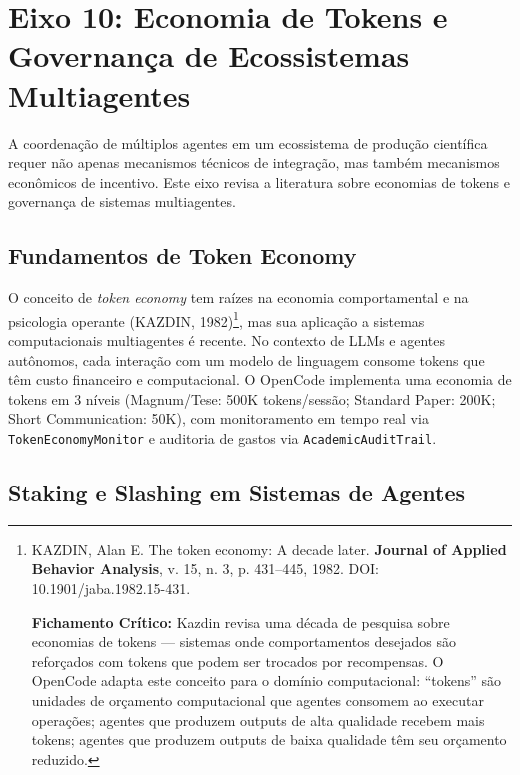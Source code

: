 \section{Eixo 10: Economia de Tokens e Governança de Ecossistemas Multiagentes}

A coordenação de múltiplos agentes em um ecossistema de produção científica requer não apenas mecanismos técnicos de integração, mas também mecanismos econômicos de incentivo. Este eixo revisa a literatura sobre economias de tokens e governança de sistemas multiagentes.

\subsection{Fundamentos de Token Economy}

O conceito de \textit{token economy} tem raízes na economia comportamental e na psicologia operante (KAZDIN, 1982)\footnote{
  KAZDIN, Alan E. The token economy: A decade later. \textbf{Journal of Applied Behavior Analysis}, v. 15, n. 3, p. 431--445, 1982. DOI: 10.1901/jaba.1982.15-431.

  \textbf{Fichamento Crítico:} Kazdin revisa uma década de pesquisa sobre economias de tokens --- sistemas onde comportamentos desejados são reforçados com tokens que podem ser trocados por recompensas. O OpenCode adapta este conceito para o domínio computacional: ``tokens'' são unidades de orçamento computacional que agentes consomem ao executar operações; agentes que produzem outputs de alta qualidade recebem mais tokens; agentes que produzem outputs de baixa qualidade têm seu orçamento reduzido.
}, mas sua aplicação a sistemas computacionais multiagentes é recente. No contexto de LLMs e agentes autônomos, cada interação com um modelo de linguagem consome tokens que têm custo financeiro e computacional. O OpenCode implementa uma economia de tokens em 3 níveis (Magnum/Tese: 500K tokens/sessão; Standard Paper: 200K; Short Communication: 50K), com monitoramento em tempo real via \texttt{TokenEconomyMonitor} e auditoria de gastos via \texttt{AcademicAuditTrail}.

\subsection{Staking e Slashing em Sistemas de Agentes}


